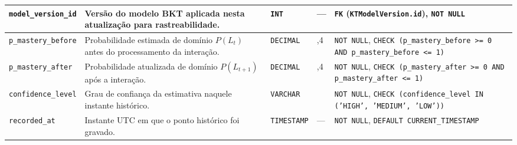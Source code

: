 \begin{anexosenv}
{\begin{longtable}{>{\raggedright\arraybackslash}p{3.0cm}>{\raggedright\arraybackslash}p{4.9cm}>{\raggedright\arraybackslash}p{1.75cm}>{\centering\arraybackslash}p{0.95cm}>{\raggedright\arraybackslash}p{3.7cm}}
\hline
\texttt{model\_\allowbreak version\_\allowbreak id} & Versão do modelo BKT aplicada nesta atualização para rastreabilidade. & \texttt{INT} & --- & \texttt{FK} (\texttt{KTModelVersion.\allowbreak id}), \texttt{NOT NULL} \\
\hline
\texttt{p\_\allowbreak mastery\_\allowbreak before} & Probabilidade estimada de domínio $P(L_t)$ antes do processamento da interação. & \texttt{DECIMAL} & 5,4 & \texttt{NOT NULL}, \texttt{CHECK (p\_\allowbreak mastery\_\allowbreak before >= 0 AND p\_\allowbreak mastery\_\allowbreak before <= 1)} \\
\hline
\texttt{p\_\allowbreak mastery\_\allowbreak after} & Probabilidade atualizada de domínio $P(L_{t+1})$ após a interação. & \texttt{DECIMAL} & 5,4 & \texttt{NOT NULL}, \texttt{CHECK (p\_\allowbreak mastery\_\allowbreak after >= 0 AND p\_\allowbreak mastery\_\allowbreak after <= 1)} \\
\hline
\texttt{confidence\_\allowbreak level} & Grau de confiança da estimativa naquele instante histórico. & \texttt{VARCHAR} & 50 & \texttt{NOT NULL}, \texttt{CHECK (confidence\_\allowbreak level IN ('HIGH', 'MEDIUM', 'LOW'))} \\
\hline
\texttt{recorded\_\allowbreak at} & Instante UTC em que o ponto histórico foi gravado. & \texttt{TIMESTAMP} & --- & \texttt{NOT NULL}, \texttt{DEFAULT CURRENT\_\allowbreak TIMESTAMP} \\
\hline
\end{longtable}

}

\end{anexosenv}
